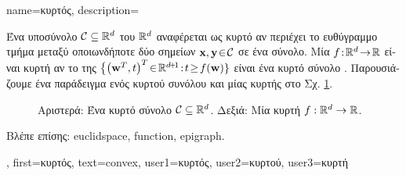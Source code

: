 {name={\foreignlanguage{greek}{κυρτός}},
	description={\foreignlanguage{greek}{Ένα υποσύνολο} 
		$\mathcal{C} \subseteq \mathbb{R}^{d}$  
		\foreignlanguage{greek}{του}  $\mathbb{R}^{d}$ \foreignlanguage{greek}{αναφέρεται ως κυρτό αν περιέχει  
		το ευθύγραμμο τμήμα μεταξύ οποιωνδήποτε δύο σημεί\-ων ${\bf x}, {\bf y}\!\in\!\mathcal{C}$ σε ένα σύνολο. Μία}   
		$f\!:\!\mathbb{R}^{d}\!\rightarrow\!\mathbb{R}$ \foreignlanguage{greek}{είναι κυρτή αν το} 
		 \foreignlanguage{greek}{της} $\big\{ \big( \weights^{T},t \big)^{T}\!\in\!\mathbb{R}^{\dimlocalmodel\!+\!1}\!:\!t\!\geq\!f(\weights) \}$ 
		\foreignlanguage{greek}{είναι ένα κυρτό σύνολο} \cite{BoydConvexBook}. \foreignlanguage{greek}{Παρουσιάζουμε ένα παράδειγμα 
		ενός κυρτού συνόλου και μίας κυρτής}  \foreignlanguage{greek}{στο Σχ.} \ref{fig_convex_set_function_dict}. 
		\begin{figure}[H]
		\begin{center}
			\vspace*{-8mm}
			\end{center}
			{
			\caption{\foreignlanguage{greek}{Αριστερά: Ένα κυρτό σύνολο $\mathcal{C} \subseteq \mathbb{R}^{d}$. 
				Δεξιά: Μία κυρτή}  $f: \mathbb{R}^{d} \rightarrow \mathbb{R}$.\label{fig_convex_set_function_dict}} }
		\end{figure}
		\foreignlanguage{greek}{Βλέπε επίσης:} \gls{euclidspace}, \gls{function}, \gls{epigraph}.},
	first={\foreignlanguage{greek}{κυρτός}},
	text={convex},
	user1={\foreignlanguage{greek}{κυρτός}}, %
	user2={\foreignlanguage{greek}{κυρτού}}, %
	user3={\foreignlanguage{greek}{κυρτή}} %
}

